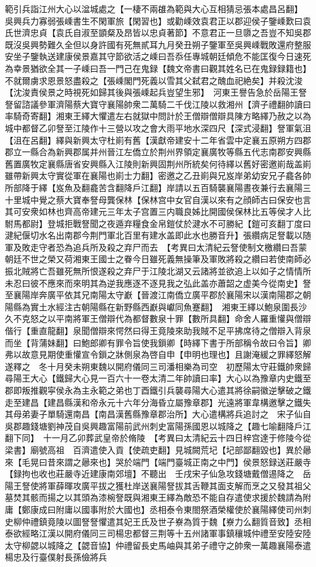 範引兵詣江州大心以湓城處之【一棲不兩䧺為範與大心互相猜忌張本處昌呂翻】　吳興兵力寡弱張嵊書生不閑軍旅【閑習也】或勸嵊效袁君正以郡迎侯子鑒嵊歎曰袁氏世濟忠貞【袁氏自淑至顗粲及昂皆以忠貞著節】不意君正一旦隳之吾豈不知吳郡既沒吳興勢難久全但以身許國有死無貳耳九月癸丑朔子鑒軍至吳興嵊戰敗還府整服安坐子鑒執送建康侯景嘉其守節欲活之嵊曰吾忝任專城朝廷傾危不能匡復今日速死為幸景猶欲全其一子嵊曰吾一門己在鬼録【魏文帝書曰觀其姓名已在鬼録録籍也】不就爾虜求恩景怒盡殺之【張嵊閣門死義以雪其父弑君之醜血祀絶矣】并殺沈浚【沈浚責侯景之時視死如歸其後與張嵊起兵豈望生邪】　河東王譽告急於岳陽王詧詧留諮議參軍濟陽蔡大寶守襄陽帥衆二萬騎二千伐江陵以救湘州【濟子禮翻帥讀曰率騎奇寄翻】湘東王繹大懼遣左右就獄中問計於王僧辯僧辯具陳方略繹乃赦之以為城中都督乙卯詧至江陵作十三營以攻之會大雨平地水深四尺【深式浸翻】詧軍氣沮【沮在呂翻】繹與新興太守杜崱有舊【漢獻帝建安十二年省雲中定襄五原朔方四郡郡立一縣合為新興郡属并州晉江左僑立於荆州界領定襄廣牧等縣五代志南郡安興縣舊置廣牧定襄縣唐省安興縣入江陵則新興固荆州所統矣何待繹以舊好密邀崱哉盖崱雖帶新興太守實從軍在襄陽也崱士力翻】密邀之乙丑崱與兄岌岸弟幼安兄子龕各帥所部降于繹【岌魚及翻龕苦含翻降戶江翻】岸請以五百騎襲襄陽晝夜兼行去襄陽三十里城中覺之蔡大寶奉詧母龔保林【保林宫中女官自漢以來有之顔師古曰保安也言其可安衆如林也齊高帝建元三年太子宫置三内職良姊比開國侯保林比五等侯才人比駙馬都尉】登城拒戰詧聞之夜遁弃糧食金帛鎧仗於湕水不可勝紀【鎧可亥翻丁度曰湕紀偃切水名出南郡今荆門軍北百里有建水盖即此水也勝音升】張纘病足詧載以随軍及敗走守者恐為追兵所及殺之弃尸而去　【考異曰太清紀云詧使制文檄纘曰吾蒙朝廷不世之榮又荷湘東王國士之眷今日雖死義無操筆及軍敗將殺之纘曰若使南師必振北賊將亡吾雖死無所恨遂殺之弃尸于江陵北湖又云諸將並欲追上以如子之情情所未忍曰彼不應來而來明其為逆我應逐不逐見我之弘此盖亦蕭韶之虚美今從南史】詧至襄陽岸奔廣平依其兄南陽太守巚【晉渡江南僑立廣平郡於襄陽宋以漢南陽郡之朝陽縣為實土水經注古朝陽縣在新野縣西巚與巘同魚蹇翻】　湘東王繹以鮑泉圍長沙久不克怒之以平南將軍王僧辯代為都督數泉十罪【數所具翻】命舍人羅重懽與僧辯偕行【重直龍翻】泉聞僧辯來愕然曰得王竟陵來助我賊不足平拂席待之僧辯入背泉而坐【背蒲妹翻】曰鮑郎卿有罪令旨使我鎻卿【時繹下書于所部稱令故曰令旨】卿弗以故意見期使重懽宣令鎻之牀側泉為啓自申【申明也理也】且謝淹緩之罪繹怒解遂釋之　冬十月癸未朔東魏以開府儀同三司潘相樂為司空　初歷陽太守莊鐵帥衆歸尋陽王大心【鐵歸大心見一百六十一卷太清二年帥讀曰率】大心以為豫章内史鐵至郡即叛推觀寜侯永為主永範之弟也丁酉鐵引兵襲尋陽大心遣其將徐嗣徽逆擊破之鐵走至建昌【建昌縣漢和帝永元十六年分海昏立屬豫章郡】光遠將軍韋構邀擊之鐵失其母弟妻子單騎還南昌【南昌漢舊縣豫章郡治所】大心遣構將兵追討之　宋子仙自吳郡趣錢塘劉神茂自吳興趣富陽前武州刺史富陽孫國恩以城降之【趣七喻翻降戶江翻下同】　十一月乙卯葬武皇帝於脩陵　【考異曰太清紀云十四日梓宫達于修陵今從梁書】廟號高祖　百濟遣使入貢【使疏吏翻】見城闕荒圮【圮部鄙翻毀也】異於曏來【毛晃曰昔來謂之曏來也】哭於端門【端門臺城正南之中門】侯景怒録送莊嚴寺【録拘也收也莊嚴寺近建康南郊壇】不聽出　壬戌宋子仙急攻錢塘戴僧逷降之　岳陽王詧使將軍薛暉攻廣平拔之獲杜岸送襄陽詧拔其舌鞭其面支解而烹之又發其祖父墓焚其骸而揚之以其頭為漆椀詧既與湘東王繹為敵恐不能自存遣使求援於魏請為附庸【鄭康成曰附庸以國事附於大國也】丞相泰令東閤祭酒榮權使於襄陽繹使司州刺史柳仲禮鎮竟陵以圖詧詧懼遣其妃王氏及世子嶚為質于魏【嶚力么翻質音致】丞相泰欲經略江漢以開府儀同三司楊忠都督三荆等十五州諸軍事鎮穰城仲禮至安陸安陸太守柳勰以城降之【勰音協】仲禮留長史馬岫與其弟子禮守之帥衆一萬趣襄陽泰遣楊忠及行臺僕射長孫儉將兵